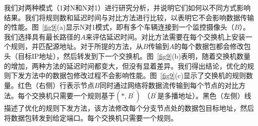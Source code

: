 \documentclass{ctexart}
\begin{document}
我们对两种模式（1对N和N对1）进行研究分析，并说明它们如何以不同方式影响结果。我们将规则数和延迟时间与对比方法进行比较，以表明它不会影响数据传输的性能。图~\ref{fig9}(a)显示N对1模式，即有多个车辆连接到一个监控摄像头（$B$）。我们选择具有最长路径的$A$来评估延迟时间。对比方法需要在每个交换机上安装一个规则，并匹配源地址。对于所提的方法，从$B$传输到$A$的每个数据包都会修改包头（目标IP地址），然后转发到下一个交换机。图~\ref{fig9}(b)表明，随着交换机数量的增加，两种方法的延迟时间都变大，但没有显着差异。我们得出结论，优化的规则下发方法中的数据包修改过程不会影响性能。图~\ref{fig9}(c)显示了交换机的规则数量。红色（右侧）行表示节点$B$同时通过网络将数据流传输到每个节点的对比方法。每个交换机只需要一个规则基于$(*, B^{'})$ （$B^{'}$是多播地址）。黑色（左侧）线描述了优化的规则下发方法，该方法修改每个分支节点处的数据包目标地址，然后将数据包转发到给定端口。每个交换机只需要一个规则。


\end{document}
